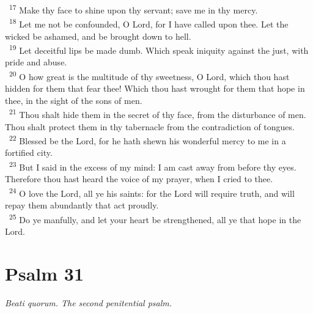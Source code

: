 \documentclass[a5paper,12pt]{article}
\begin{document}
\begin{multicols*}{2}
~\textsuperscript{17} Make thy face to shine upon thy servant; save me in thy mercy.\\
~\textsuperscript{18} Let me not be confounded, O Lord, for I have called upon thee. Let the wicked be ashamed, and be brought down to hell.\\
~\textsuperscript{19} Let deceitful lips be made dumb. Which speak iniquity against the just, with pride and abuse.\\
~\textsuperscript{20} O how great is the multitude of thy sweetness, O Lord, which thou hast hidden for them that fear thee! Which thou hast wrought for them that hope in thee, in the sight of the sons of men.\\
~\textsuperscript{21} Thou shalt hide them in the secret of thy face, from the disturbance of men. Thou shalt protect them in thy tabernacle from the contradiction of tongues.\\
~\textsuperscript{22} Blessed be the Lord, for he hath shewn his wonderful mercy to me in a fortified city.\\
~\textsuperscript{23} But I said in the excess of my mind: I am cast away from before thy eyes. Therefore thou hast heard the voice of my prayer, when I cried to thee.\\
~\textsuperscript{24} O love the Lord, all ye his saints: for the Lord will require truth, and will repay them abundantly that act proudly.\\
~\textsuperscript{25} Do ye manfully, and let your heart be strengthened, all ye that hope in the Lord.\\

\section{Psalm 31}
\label{sec:orga756367}
\emph{Beati quorum. The second penitential psalm.}\\


\end{multicols*}
\end{document}
